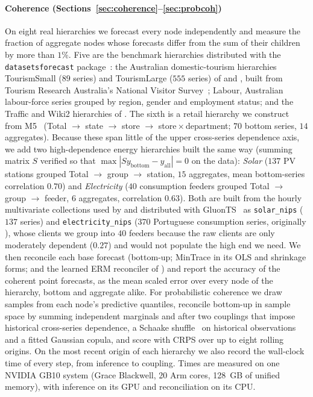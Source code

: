 \documentclass[review,number]{elsarticle}
\begin{document}
\paragraph{Coherence (Sections~\ref{sec:coherence}--\ref{sec:probcoh})} On eight real
hierarchies we forecast every node independently and measure the fraction of aggregate
nodes whose forecasts differ from the sum of their children by more than $1\%$. Five are
the benchmark hierarchies distributed with the \texttt{datasetsforecast}
package~\citep{datasetsforecast}: the Australian domestic-tourism hierarchies
TourismSmall ($89$ series) and TourismLarge ($555$ series) of \citet{hyndman2011} and
\citet{mint2019}, built from Tourism Research Australia's National Visitor
Survey~\citep{data_tourism}; Labour, Australian labour-force series grouped by region,
gender and employment status; and the Traffic and Wiki2 hierarchies of
\citet{bentaieb2019erm}. The sixth is a retail
hierarchy we construct from M5~\citep{data_m5} (Total $\to$ state $\to$ store $\to$
store\,$\times$\,department; $70$ bottom series, $14$ aggregates). Because these span
little of the upper cross-series dependence axis, we add two high-dependence energy
hierarchies built the same way (summing matrix $S$ verified so that
$\max|S y_{\text{bottom}}-y_{\text{all}}|=0$ on the data): \emph{Solar} ($137$ PV stations
grouped Total $\to$ group $\to$ station, $15$ aggregates, mean bottom-series correlation
$0.70$) and \emph{Electricity} ($40$ consumption feeders grouped Total $\to$ group $\to$
feeder, $6$ aggregates, correlation $0.63$). Both are built from the hourly multivariate
collections used by \citet{salinas2019gpcopula} and distributed with
GluonTS~\citep{gluonts2020} as \texttt{solar\_nips} ($137$ series) and
\texttt{electricity\_nips} ($370$ Portuguese consumption series, originally
\citet{data_electricity}), whose clients we group into $40$ feeders because the raw
clients are only moderately dependent ($0.27$) and would not populate the high end we
need. We then reconcile each base forecast
(bottom-up; MinTrace in its OLS and shrinkage forms; and the learned ERM reconciler of
\citet{bentaieb2019erm}) and
report the accuracy of the coherent point forecasts, as the mean scaled error over every
node of the hierarchy, bottom and aggregate alike. For probabilistic coherence we
draw samples from each
node's predictive quantiles, reconcile bottom-up in sample space by summing
independent marginals and after two couplings that impose historical cross-series
dependence, a Schaake shuffle~\citep{schaake2004} on historical observations and a
fitted Gaussian copula, and score with CRPS over up to eight rolling origins. On the
most recent origin of each hierarchy we also record the wall-clock time of every step,
from inference to coupling. Times are measured on one NVIDIA GB10 system (Grace
Blackwell, 20 Arm cores, 128~GB of unified memory), with inference on its GPU and
reconciliation on its CPU.
\end{document}
